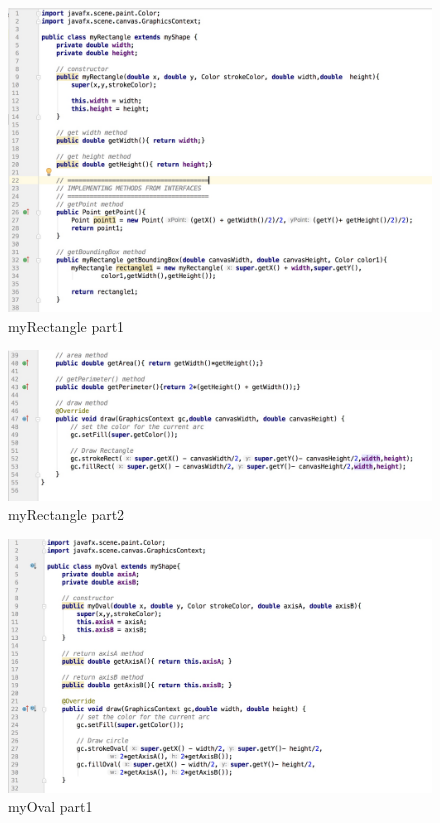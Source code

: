 \documentclass[a4paper,12pt]{article}
\begin{document}
\begin{figure}[H]
   \centering
   \includegraphics[width = 17cm]{myRectangle_part1} %
   \caption{myRectangle part1}
   \label{myRectangle part1}
\end{figure}



\begin{figure}[H]
   \centering
   \includegraphics[width = 17cm]{myRectangle_part2} %
   \caption{myRectangle part2}
   \label{myRectangle part2}
\end{figure}


\begin{figure}[H]
   \centering
   \includegraphics[width = 17cm]{myOval_part1} %
   \caption{myOval part1}
   \label{myOval part1}
\end{figure}
\end{document}
